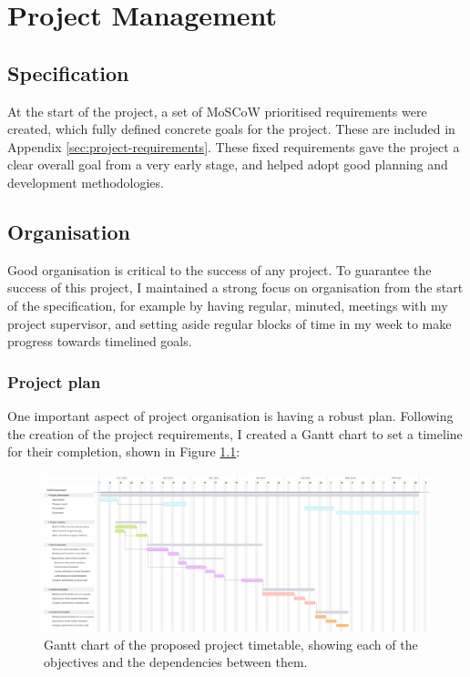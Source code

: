 \chapter{Project Management}
\label{ch:project-management}

\section{Specification}
\label{sec:specification}

At the start of the project, a set of MoSCoW prioritised \cite{CaseMethodFastTrack} requirements were created, which fully defined concrete goals for the project. These are included in Appendix \ref{sec:project-requirements}. These fixed requirements gave the project a clear overall goal from a very early stage, and helped adopt good planning and development methodologies. 

\section{Organisation}
\label{sec:organisation}

Good organisation is critical to the success of any project. To guarantee the success of this project, I maintained a strong focus on organisation from the start of the specification, for example by having regular, minuted, meetings with my project supervisor, and setting aside regular blocks of time in my week to make progress towards timelined goals.

\subsection{Project plan}
\label{ssec:organisation-plan}

One important aspect of project organisation is having a robust plan. Following the creation of the project requirements, I created a Gantt chart to set a timeline for their completion, shown in Figure \ref{fig:diss_gantt_spec_2}:

\begin{figure}[ht]
    \centering
    \includegraphics[width=\textwidth]{images/6_project_management/diss_gantt_spec_2.png}
    \caption{Gantt chart of the proposed project timetable, showing each of the objectives and the dependencies between them.}
    \label{fig:diss_gantt_spec_2}
\end{figure}

